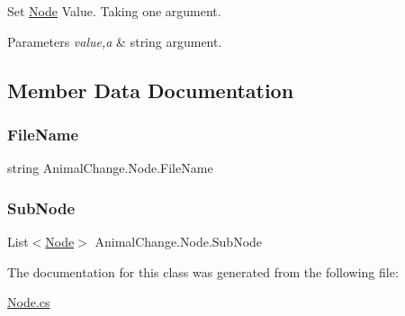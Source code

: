 Set \mbox{\hyperlink{class_animal_change_1_1_node}{Node}} Value. Taking one argument. 


\begin{DoxyParams}{Parameters}
{\em value,a} & string argument. \\
\hline
\end{DoxyParams}


\subsection{Member Data Documentation}
\mbox{\label{class_animal_change_1_1_node_a749e8e44c92c916434a3652073c9a5f0}} 
\subsubsection{\texorpdfstring{FileName}{FileName}}
{\footnotesize\ttfamily string Animal\+Change.\+Node.\+File\+Name}

\mbox{\label{class_animal_change_1_1_node_af7065c690421627793167f33cbb8d4e2}} 
\subsubsection{\texorpdfstring{SubNode}{SubNode}}
{\footnotesize\ttfamily List$<$\mbox{\hyperlink{class_animal_change_1_1_node}{Node}}$>$ Animal\+Change.\+Node.\+Sub\+Node}



The documentation for this class was generated from the following file\+:\begin{DoxyCompactItemize}
\item 
\mbox{\hyperlink{_node_8cs}{Node.\+cs}}\end{DoxyCompactItemize}
